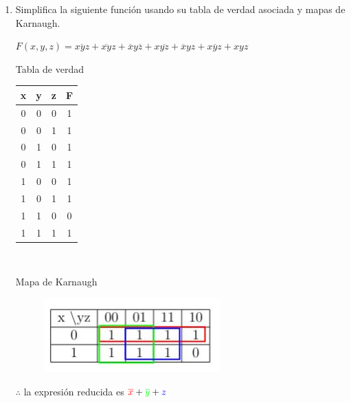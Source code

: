 \documentclass[a4paper,12pt]{article}
\begin{document}
\begin{enumerate}[label=\textcolor{teal}{\textbf{\arabic*.}}]
    \item Simplifica la siguiente función usando su tabla de verdad asociada y mapas de Karnaugh.
    
        \begin{center}
            $F(x,y,z) = \overline{xyz} + \overline{xy} z + \overline{x} y \overline{z} + x \overline{yz} +  \overline{x} yz +x \overline{y} z +xyz $
        \end{center}

        Tabla de verdad

            \begin{table}[H]
            \centering
            \begin{tabular}{|c|c|c|c|}
                \hline
                x & y & z & F \\ 
                \hline
                0 & 0 & 0 & 1 \\ 
                \hline 
                0 & 0 & 1 & 1 \\ 
                \hline 
                0 & 1 & 0 & 1 \\ 
                \hline 
                0 & 1 & 1 & 1 \\ 
                \hline 
                1 & 0 & 0 & 1 \\ 
                \hline 
                1 & 0 & 1 & 1 \\ 
                \hline 
                1 & 1 & 0 & 0 \\
                \hline 
                1 & 1 & 1 & 1 \\ 
                \hline 
            \end{tabular}\\
        \end{table}

        Mapa de Karnaugh

        \begin{figure}[H]
            \centering
            \includegraphics[width=5 cm]{img/mapa7.jpg}
        \end{figure}
        
        $ \therefore$ la expresión reducida es  $ \textcolor{red}{\overline{x}}+ \textcolor{green}{\overline{y}} + \textcolor{blue}{z}$


\end{enumerate}
\end{document}
